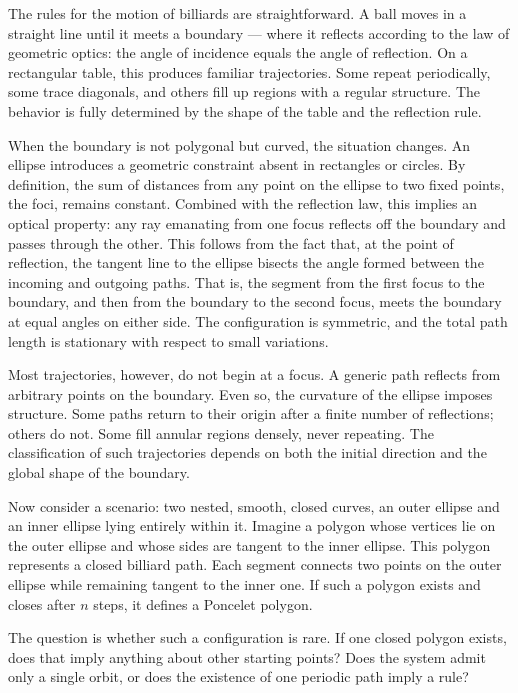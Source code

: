 The rules for the motion of billiards are straightforward. A ball moves in a straight line until it meets a boundary — where it reflects according to the law of geometric optics: the angle of incidence equals the angle of reflection. On a rectangular table, this produces familiar trajectories. Some repeat periodically, some trace diagonals, and others fill up regions with a regular structure. The behavior is fully determined by the shape of the table and the reflection rule.

When the boundary is not polygonal but curved, the situation changes. An ellipse introduces a geometric constraint absent in rectangles or circles. By definition, the sum of distances from any point on the ellipse to two fixed points, the foci, remains constant. Combined with the reflection law, this implies an optical property: any ray emanating from one focus reflects off the boundary and passes through the other. This follows from the fact that, at the point of reflection, the tangent line to the ellipse bisects the angle formed between the incoming and outgoing paths. That is, the segment from the first focus to the boundary, and then from the boundary to the second focus, meets the boundary at equal angles on either side. The configuration is symmetric, and the total path length is stationary with respect to small variations.

Most trajectories, however, do not begin at a focus. A generic path reflects from arbitrary points on the boundary. Even so, the curvature of the ellipse imposes structure. Some paths return to their origin after a finite number of reflections; others do not. Some fill annular regions densely, never repeating. The classification of such trajectories depends on both the initial direction and the global shape of the boundary.

Now consider a scenario: two nested, smooth, closed curves, an outer ellipse and an inner ellipse lying entirely within it. Imagine a polygon whose vertices lie on the outer ellipse and whose sides are tangent to the inner ellipse. This polygon represents a closed billiard path. Each segment connects two points on the outer ellipse while remaining tangent to the inner one. If such a polygon exists and closes after $n$ steps, it defines a Poncelet polygon.

The question is whether such a configuration is rare. If one closed polygon exists, does that imply anything about other starting points? Does the system admit only a single orbit, or does the existence of one periodic path imply a rule?

